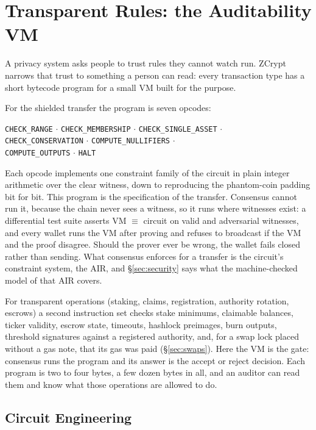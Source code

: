 \documentclass[twocolumn,10pt]{article}
\begin{document}
\section{Transparent Rules: the Auditability VM}
\label{sec:vm}

A privacy system asks people to trust rules they cannot watch run. ZCrypt narrows that trust to something a person can read: every transaction type has a short bytecode program for a small VM built for the purpose.

For the shielded transfer the program is seven opcodes:
\begin{center}
\texttt{CHECK\_RANGE} $\cdot$ \texttt{CHECK\_MEMBERSHIP} $\cdot$ \texttt{CHECK\_SINGLE\_ASSET} $\cdot$\\
\texttt{CHECK\_CONSERVATION} $\cdot$ \texttt{COMPUTE\_NULLIFIERS} $\cdot$\\
\texttt{COMPUTE\_OUTPUTS} $\cdot$ \texttt{HALT}
\end{center}
Each opcode implements one constraint family of the circuit in plain integer arithmetic over the clear witness, down to reproducing the phantom-coin padding bit for bit. This program is the specification of the transfer. Consensus cannot run it, because the chain never sees a witness, so it runs where witnesses exist: a differential test suite asserts VM $\equiv$ circuit on valid and adversarial witnesses, and every wallet runs the VM after proving and refuses to broadcast if the VM and the proof disagree. Should the prover ever be wrong, the wallet fails closed rather than sending. What consensus enforces for a transfer is the circuit's constraint system, the AIR, and \S\ref{sec:security} says what the machine-checked model of that AIR covers.

For transparent operations (staking, claims, registration, authority rotation, escrows) a second instruction set checks stake minimums, claimable balances, ticker validity, escrow state, timeouts, hashlock preimages, burn outputs, threshold signatures against a registered authority, and, for a swap lock placed without a gas note, that its gas was paid (\S\ref{sec:swaps}). Here the VM is the gate: consensus runs the program and its answer is the accept or reject decision. Each program is two to four bytes, a few dozen bytes in all, and an auditor can read them and know what those operations are allowed to do.

\subsection{Circuit Engineering}
\end{document}
